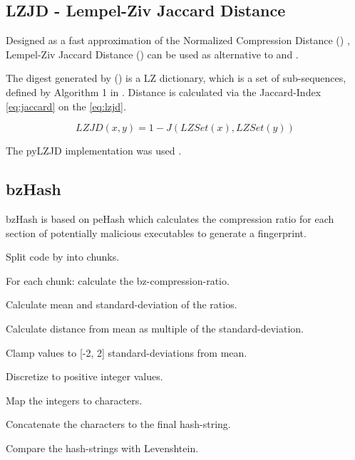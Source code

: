 \documentclass[../main.tex]{subfiles}
\begin{document}
\subsection{LZJD - Lempel-Ziv Jaccard Distance}
Designed as a fast approximation of the Normalized Compression Distance () \cite{raff2017alternative}, Lempel-Ziv Jaccard Distance () can be used as alternative to  and  \cite{raff2018lempel}.

The digest generated by  () is a LZ dictionary, which is a set of sub-sequences, defined by Algorithm 1 in \cite{raff2017alternative}. Distance is calculated via the Jaccard-Index \eqref{eq:jaccard} on the  \eqref{eq:lzjd}.

\begin{equation}
  LZJD(x,y) = 1 - J(LZSet(x), LZSet(y))
  \label{eq:lzjd}
\end{equation}

The pyLZJD implementation was used \cite{raff2019pylzjd}.


\subsection{bzHash}
bzHash is based on peHash\cite{wicherski2009pehash} which calculates the compression ratio for each section of potentially malicious executables to generate a fingerprint.

\begin{ol}
  \item Split code by  into chunks.
  \item For each chunk: calculate the bz-compression-ratio.
  \item Calculate mean and standard-deviation of the ratios.
  \item Calculate distance from mean as multiple of the standard-deviation.
  \item Clamp values to [-2, 2] standard-deviations from mean.
  \item Discretize to positive integer values.
  \item Map the integers to characters.
  \item Concatenate the characters to the final hash-string.
  \item Compare the hash-strings with Levenshtein.
\end{ol}
\end{document}
